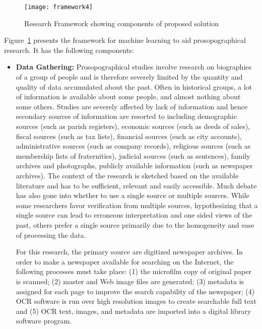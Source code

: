 \begin{figure}
\centering
\texttt{[image: framework4]}
\caption{Research Framework showing components of proposed solution}
\label{fig:framework}
\vspace{-10pt}
\end{figure}
Figure~\ref{fig:framework} presents the framework for machine learning to aid prosopographical research. It has the following components:

\begin{itemize}
\item \textbf{Data Gathering: } Prosopographical studies involve research on biographies of a group of people and is therefore severely limited by the quantity and quality of data accumulated about the past. Often in historical groups, a lot of information is available about some people, and almost nothing about some others. Studies are severely affected by lack of information and hence secondary sources of information are resorted to including demographic sources (such as parish registers), economic sources (such as deeds of sales), fiscal sources (such as tax lists), financial sources (such as city accounts), administrative sources (such as company records), religious sources (such as membership lists of fraternities), judicial sources (such as sentences), family archives and photographs, publicly available information (such as newspaper archives). The context of the research is sketched based on the available literature and has to be sufficient, relevant and easily accessible. Much debate has also gone into whether to use a single source or multiple sources. While some researchers favor verification from multiple sources, hypothesizing that a single source can lead to erroneous interpretation and one sided views of the past, others prefer a single source primarily due to the homogeneity and ease of processing the data. 

For this research, the primary source are digitized newspaper archives. In order to make a newspaper available for searching on the Internet,
the following processes \cite{dutta2011learning} must take place: (1) the microfilm copy of original paper is scanned; (2) master and Web image files are
generated; (3) metadata is assigned for each page to improve the
search capability of the newspaper; (4) OCR software is run over high
resolution images to create searchable full text and (5) OCR text,
images, and metadata are imported into a digital library software
program. 


\end{itemize}
